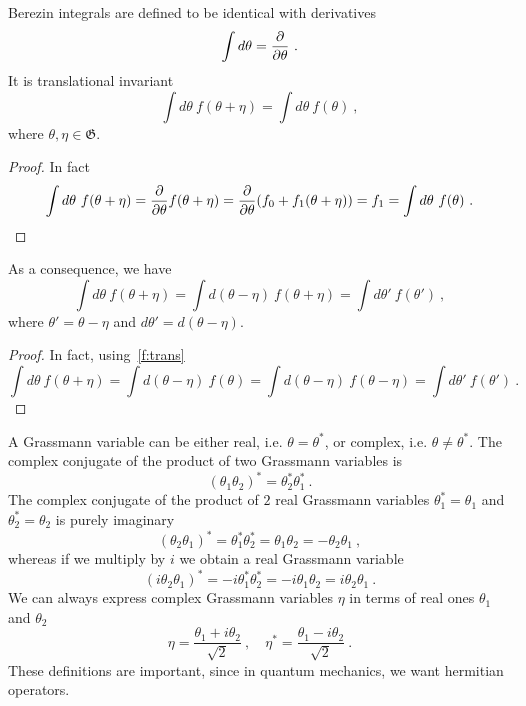    Berezin integrals are defined to be identical with derivatives
    \begin{equation*}
        \int d\theta = \frac{\partial}{\partial\theta} ~.
    \end{equation*}
    It is translational invariant
    \begin{equation}\label{f:trans}
        \int d\theta ~ f(\theta + \eta) = \int d\theta ~ f(\theta) ~,
    \end{equation}
    where $\theta, \eta \in \mathfrak G$.
    \begin{proof}
        In fact 
        \begin{equation*}
            \int d\theta ~ f(\theta + \eta) = \frac{\partial}{\partial\theta} f(\theta + \eta) = \frac{\partial}{\partial\theta} (f_0 + f_1 (\theta + \eta)) = f_1 = \int d\theta ~ f(\theta) ~.
        \end{equation*}
    \end{proof}
    As a consequence, we have 
    \begin{equation*}
        \int d\theta ~ f(\theta + \eta) = \int d(\theta - \eta) ~ f(\theta + \eta) = \int d\theta' ~ f(\theta') ~,
    \end{equation*}
    where $\theta' = \theta - \eta$ and $d\theta' = d (\theta - \eta)$.
    \begin{proof}
        In fact, using~\eqref{f:trans}
        \begin{equation*}
            \int d\theta ~ f(\theta + \eta) = \int d(\theta - \eta) ~ f(\theta) = \int d(\theta - \eta) ~ f(\theta - \eta) = \int d\theta' ~ f(\theta') ~.
        \end{equation*}
    \end{proof}

    A Grassmann variable can be either real, i.e. $\theta = \theta^*$, or complex, i.e. $\theta \neq \theta^*$. The complex conjugate of the product of two Grassmann variables is 
    \begin{equation*}
        (\theta_1 \theta_2)^* = \theta_2^* \theta_1^* ~.
    \end{equation*}
    The complex conjugate of the product of $2$ real Grassmann variables $\theta_1^* = \theta_1$ and $\theta_2^* = \theta_2$ is purely imaginary 
    \begin{equation*}
        (\theta_2 \theta_1)^* = \theta_1^* \theta_2^* = \theta_1 \theta_2 = - \theta_2 \theta_1 ~,
    \end{equation*}
    whereas if we multiply by $i$ we obtain a real Grassmann variable 
    \begin{equation*}
        (i \theta_2 \theta_1)^* = - i\theta_1^* \theta_2^* = - i \theta_1 \theta_2 = i \theta_2 \theta_1 ~.
    \end{equation*}
    We can always express complex Grassmann variables $\eta$ in terms of real ones $\theta_1$ and $\theta_2$
    \begin{equation*}
        \eta = \frac{\theta_1 + i \theta_2}{\sqrt 2} ~, \quad \eta^* = \frac{\theta_1 - i \theta_2}{\sqrt 2} ~.
    \end{equation*}
    These definitions are important, since in quantum mechanics, we want hermitian operators.

